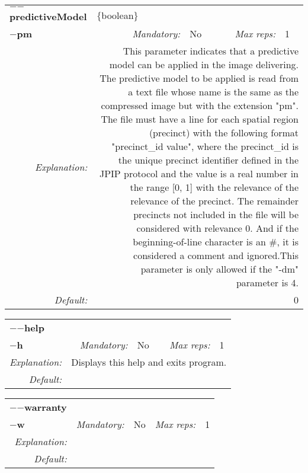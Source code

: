 \begin{center}\begin{tabular}{|rr|rl|rl|}
\hline
\multicolumn{2}{|l|}{\textbf{$-$$-$predictiveModel}} & \multicolumn{4}{|l|}{$\{$boolean$\}$} \\
\cline{3-6}
\multicolumn{2}{|l|}{\textbf{$-$pm}} & \emph{Mandatory:} & No & \emph{Max reps:} & 1 \\
\hline
\emph{Explanation:} & \multicolumn{5}{|p{12cm}|}{This parameter indicates that a predictive model can be applied in the image delivering. The predictive model to be applied is read from a text file whose name is the same as the compressed image but with the extension "pm". The file must have a line for each spatial region (precinct) with the following format "precinct\_id value", where the precinct\_id is the unique precinct identifier defined in the JPIP protocol and the value is a real number in the range [0, 1] with the relevance of the relevance of the precinct. The remainder precincts not included in the file will be considered with relevance 0. And if the beginning-of-line character is an \#, it is considered a comment and ignored.This parameter is only allowed if the "-dm" parameter is 4.
} \\
\hline
\emph{Default:} & \multicolumn{5}{|p{12cm}|}{0} \\
\hline
\end{tabular}\end{center}
\begin{center}\begin{tabular}{|rr|rl|rl|}
\hline
\multicolumn{2}{|l|}{\textbf{$-$$-$help}} & \multicolumn{4}{|l|}{} \\
\cline{3-6}
\multicolumn{2}{|l|}{\textbf{$-$h}} & \emph{Mandatory:} & No & \emph{Max reps:} & 1 \\
\hline
\emph{Explanation:} & \multicolumn{5}{|p{12cm}|}{Displays this help and exits program.} \\
\hline
\emph{Default:} & \multicolumn{5}{|p{12cm}|}{} \\
\hline
\end{tabular}\end{center}
\begin{center}\begin{tabular}{|rr|rl|rl|}
\hline
\multicolumn{2}{|l|}{\textbf{$-$$-$warranty}} & \multicolumn{4}{|l|}{} \\
\cline{3-6}
\multicolumn{2}{|l|}{\textbf{$-$w}} & \emph{Mandatory:} & No & \emph{Max reps:} & 1 \\
\hline
\emph{Explanation:} & \multicolumn{5}{|p{12cm}|}{} \\
\hline
\emph{Default:} & \multicolumn{5}{|p{12cm}|}{} \\
\hline
\end{tabular}\end{center}
